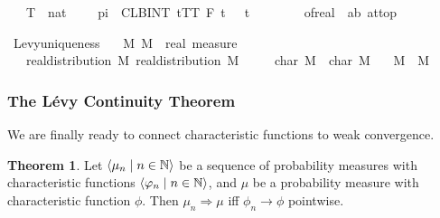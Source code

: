\documentclass{article}
\theoremstyle{definition}
\newtheorem{theorem}{Theorem}[section]
\newcommand{\bldseq}[2]{\langle{#1}\mid{#2}\rangle}
\begin{document}
\begin{isabellebody}
\ \ {\isacharparenleft}\ {\isachardoublequoteopen}{\isacharparenleft}{\isacharparenleft}{\isasymlambda}T\ {\isacharcolon}{\isacharcolon}\ nat{\isachardot}\ {}\ {\isacharslash}\ {\isacharparenleft}{}\ {\isacharasterisk}\ pi{\isacharparenright}\ {\isacharasterisk}\ {\isacharparenleft}CLBINT\ t{\isacharequal}{\isacharminus}T{\isachardot}{\isachardot}T{\isachardot}\ {\isacharquery}F\ t\ {\isacharasterisk}\ {\isasymphi}\ t{\isacharparenright}{\isacharparenright}\ {\isacharminus}{\isacharminus}{\isacharminus}{\isachargreater}\ \isanewline
\ \ \ \ \ \ of{\isacharunderscore}real\ {\isacharparenleft}{\isasymmu}\ {\isacharbraceleft}a{\isacharless}{\isachardot}{\isachardot}b{\isacharbraceright}{\isacharparenright}{\isacharparenright}\ at{\isacharunderscore}top{\isachardoublequoteclose}{\isacharparenright}
\end{isabellebody}

\medskip

\begin{isabellebody}
\isamarkupfalse%
\ Levy{\isacharunderscore}uniqueness{\isacharcolon}\isanewline
\ \ \ M{}\ M{}\ {\isacharcolon}{\isacharcolon}\ {\isachardoublequoteopen}real\ measure{\isachardoublequoteclose}\isanewline
\ \ \ {\isachardoublequoteopen}real{\isacharunderscore}distribution\ M{}{\isachardoublequoteclose}\ {\isachardoublequoteopen}real{\isacharunderscore}distribution\ M{}{\isachardoublequoteclose}\ \isanewline
\ \ \ \ {\isachardoublequoteopen}char\ M{}\ {\isacharequal}\ char\ M{}{\isachardoublequoteclose}\isanewline
\ \ \ {\isachardoublequoteopen}M{}\ {\isacharequal}\ M{}{\isachardoublequoteclose}
\end{isabellebody}

\subsubsection{The L\'evy Continuity Theorem}

We are finally ready to connect characteristic functions to weak convergence.

\begin{theorem}
Let $\bldseq{\mu_n}{n \in \N}$ be a sequence of probability measures with characteristic functions $\bldseq{\phi_n}{n \in \N}$, and $\mu$ be a probability measure with characteristic function $\phi$. Then $\mu_n \Rightarrow \mu$ iff $\phi_n \rightarrow \phi$ pointwise.
\end{theorem}
\end{document}
